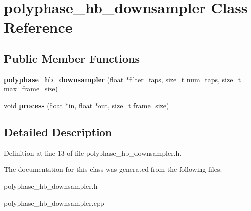 \hypertarget{classpolyphase__hb__downsampler}{}\section{polyphase\+\_\+hb\+\_\+downsampler Class Reference}
\label{classpolyphase__hb__downsampler}
\subsection*{Public Member Functions}
\begin{DoxyCompactItemize}
\item 
\mbox{\label{classpolyphase__hb__downsampler_a9c929549928b7e325e7432b5172d1246}} 
{\bfseries polyphase\+\_\+hb\+\_\+downsampler} (float $\ast$filter\+\_\+taps, size\+\_\+t num\+\_\+taps, size\+\_\+t max\+\_\+frame\+\_\+size)
\item 
\mbox{\label{classpolyphase__hb__downsampler_a7388f8a7fa60d315faddd9ca196644ee}} 
void {\bfseries process} (float $\ast$in, float $\ast$out, size\+\_\+t frame\+\_\+size)
\end{DoxyCompactItemize}


\subsection{Detailed Description}


Definition at line 13 of file polyphase\+\_\+hb\+\_\+downsampler.\+h.



The documentation for this class was generated from the following files\+:\begin{DoxyCompactItemize}
\item 
polyphase\+\_\+hb\+\_\+downsampler.\+h\item 
polyphase\+\_\+hb\+\_\+downsampler.\+cpp\end{DoxyCompactItemize}
